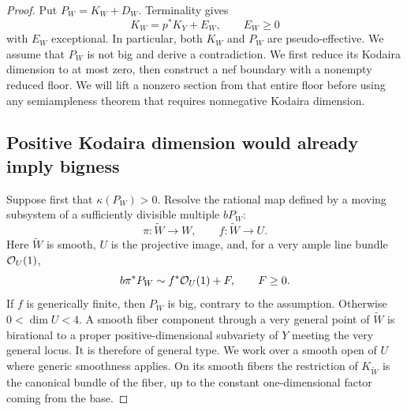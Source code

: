 \begin{proof}
Put $P_W=K_W+D_W$. Terminality gives
\[
 K_W=p^*K_Y+E_W,\qquad E_W\geq0
\]
with $E_W$ exceptional. In particular, both $K_W$ and $P_W$ are
pseudo-effective. We assume that $P_W$ is not big and derive a
contradiction. We first reduce its Kodaira dimension to at most zero,
then construct a nef boundary with a nonempty reduced floor. We will
lift a nonzero section from that entire floor before using any
semiampleness theorem that requires nonnegative Kodaira dimension.

\subsection*{Positive Kodaira dimension would already imply bigness}

Suppose first that $\kappa(P_W)>0$. Resolve the rational map defined by
a moving subsystem of a sufficiently divisible multiple $bP_W$:
\[
 \pi:\widetilde W\longrightarrow W,\qquad
 f:\widetilde W\longrightarrow U.
\]
Here $\widetilde W$ is smooth, $U$ is the projective image, and, for a
very ample line bundle $\mathcal O_U(1)$,
\begin{equation}
\label{eq:signed-moving-system}
 b\pi^*P_W\sim f^*\mathcal O_U(1)+F,\qquad F\geq0.
\end{equation}
If $f$ is generically finite, then $P_W$ is big, contrary to the
assumption. Otherwise $0<\dim U<4$. A smooth fiber component through a
very general point of $\widetilde W$ is birational to a proper
positive-dimensional subvariety of $Y$ meeting the very general locus.
It is therefore of general type. We work over a smooth open of $U$
where generic smoothness applies. On its smooth fibers the restriction
of $K_{\widetilde W}$ is the canonical bundle of the fiber, up to the
constant one-dimensional factor coming from the base.


\end{proof}
